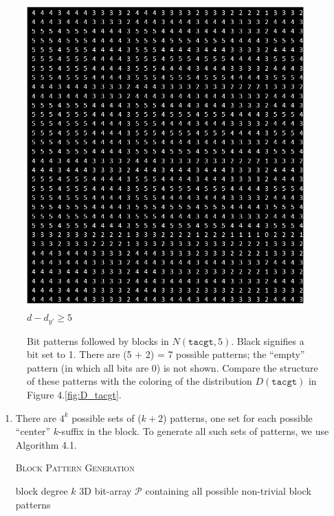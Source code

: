 \documentclass[oneside,12pt]{DISCSthesis}
\begin{document}
{\begin{figure}[h]
				\begin{minipage}{.33\textwidth} \centering \includegraphics[width=0.95\textwidth]{img/5} $d-d_{y'} \geq 5$ \end{minipage}
				\newline\newline
				\caption{Bit patterns followed by blocks in $N(\texttt{tacgt}, 5)$. Black signifies a bit set to 1. There are (5 + 2) = 7 possible patterns; the ``empty'' pattern (in which all bits are 0) is not shown. Compare the structure of these patterns with the coloring of the distribution $D(\texttt{tacgt})$ in Figure 4.\ref{fig:D_tacgt}.}
			\end{figure}

		\begin{enumerate}
			\setcounter{enumi}{\theenumTemp}
			
			\item There are $4^k$ possible sets of ($k+2$) patterns, one set for each possible ``center'' $k$-suffix in the block. To generate all such sets of patterns, we use Algorithm 4.1.

			\bigskip\bigskip

			{
			\noindent \hspace*{6pt}{\bf Algorithm 4.1}
			\textsc{Block Pattern Generation}\small
			\begin{algorithmic}[1]\label{alg:block-pattern-gen}
				\Require block degree $k$
				\Ensure 3D bit-array $\mathcal{P}$ containing all possible non-trivial block patterns \vspace*{6pt}


\end{algorithmic}}
\end{enumerate}}
\end{document}

